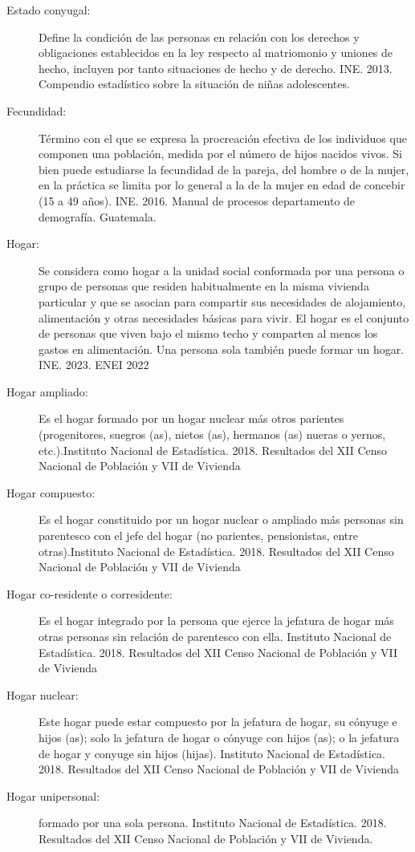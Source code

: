 \begin{description}
	\item[Estado conyugal:] Define la condición de las personas en relación con los derechos y obligaciones establecidos en la ley respecto al matriomonio y uniones de hecho, incluyen por tanto situaciones de hecho y de derecho. INE. 2013.  Compendio estadístico sobre la situación de niñas adolescentes.
	\item[Fecundidad:] Término con el que se expresa la procreación efectiva de los individuos que componen una población, medida por el número de hijos nacidos vivos. Si bien puede estudiarse la fecundidad de la pareja, del hombre o de la mujer, en la práctica se limita por lo general a la de la mujer en edad de concebir (15 a 49 años). INE. 2016. Manual de procesos departamento de demografía. Guatemala.
	\item[Hogar:] Se considera como hogar a la unidad social conformada por una persona o grupo de personas que residen habitualmente en la misma vivienda particular y que se asocian para compartir sus necesidades de alojamiento, alimentación y otras necesidades básicas para vivir. El hogar es el conjunto de personas que viven bajo el mismo techo y comparten al menos los gastos en alimentación. Una persona sola también puede formar un hogar. INE. 2023. ENEI 2022
	\item[Hogar ampliado:] Es el hogar formado por un hogar nuclear más otros parientes (progenitores, suegros (as), nietos (as), hermanos (as) nueras o yernos, etc.).Instituto Nacional de Estadística. 2018. Resultados del XII Censo Nacional de Población y VII de Vivienda
	\item[Hogar compuesto:] Es el hogar constituido por un hogar nuclear o ampliado más personas sin parentesco con el jefe del hogar (no parientes, pensionistas, entre otras).Instituto Nacional de Estadística. 2018. Resultados del XII Censo Nacional de Población y VII de Vivienda
	\item[Hogar co-residente o corresidente:] Es el hogar integrado por la persona que ejerce la jefatura de hogar más otras personas sin relación de parentesco con ella. Instituto Nacional de Estadística. 2018. Resultados del XII Censo Nacional de Población y VII de Vivienda
	\item[Hogar nuclear:] Este hogar puede estar compuesto por la jefatura de hogar, su cónyuge e hijos (as); solo la jefatura de hogar o cónyuge con hijos (as); o la jefatura de hogar y conyuge sin hijos (hijas). Instituto Nacional de Estadística. 2018. Resultados del XII Censo Nacional de Población y VII de Vivienda
	\item[Hogar unipersonal:] formado por una sola persona. Instituto Nacional de Estadística. 2018. Resultados del XII Censo Nacional de Población y VII de Vivienda.

\end{description}
